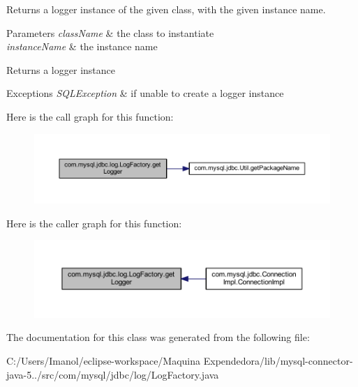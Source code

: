 Returns a logger instance of the given class, with the given instance name.


\begin{DoxyParams}{Parameters}
{\em class\+Name} & the class to instantiate \\
\hline
{\em instance\+Name} & the instance name \\
\hline
\end{DoxyParams}
\begin{DoxyReturn}{Returns}
a logger instance 
\end{DoxyReturn}

\begin{DoxyExceptions}{Exceptions}
{\em S\+Q\+L\+Exception} & if unable to create a logger instance \\
\hline
\end{DoxyExceptions}
Here is the call graph for this function\+:
\nopagebreak
\begin{figure}[H]
\begin{center}
\leavevmode
\includegraphics[width=350pt]{classcom_1_1mysql_1_1jdbc_1_1log_1_1_log_factory_a3f0b5a4ccece1431779fa4b8c79806b8_cgraph}
\end{center}
\end{figure}
Here is the caller graph for this function\+:
\nopagebreak
\begin{figure}[H]
\begin{center}
\leavevmode
\includegraphics[width=350pt]{classcom_1_1mysql_1_1jdbc_1_1log_1_1_log_factory_a3f0b5a4ccece1431779fa4b8c79806b8_icgraph}
\end{center}
\end{figure}


The documentation for this class was generated from the following file\+:\begin{DoxyCompactItemize}
\item 
C\+:/\+Users/\+Imanol/eclipse-\/workspace/\+Maquina Expendedora/lib/mysql-\/connector-\/java-\/5../src/com/mysql/jdbc/log/Log\+Factory.\+java\end{DoxyCompactItemize}
